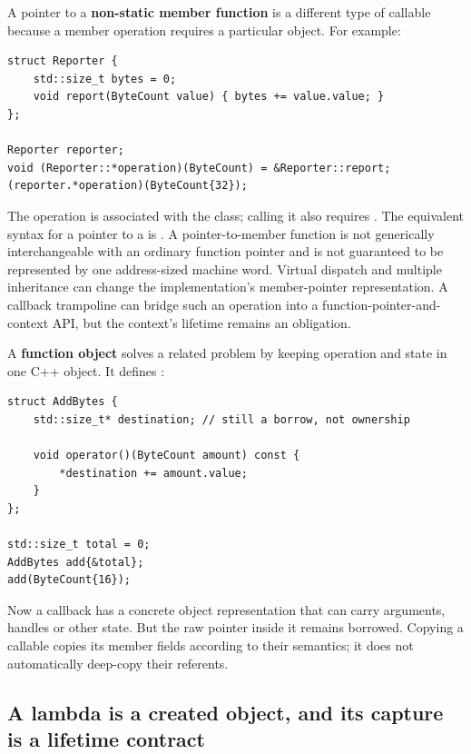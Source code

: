 A pointer to a \textbf{non-static member function} is a different type of callable because a member operation requires a particular object. For example:

\begin{verbatim}
struct Reporter {
    std::size_t bytes = 0;
    void report(ByteCount value) { bytes += value.value; }
};

Reporter reporter;
void (Reporter::*operation)(ByteCount) = &Reporter::report;
(reporter.*operation)(ByteCount{32});
\end{verbatim}

The operation is associated with the  class; calling it also requires . The equivalent syntax for a pointer to a  is . A pointer-to-member function is not generically interchangeable with an ordinary function pointer and is not guaranteed to be represented by one address-sized machine word. Virtual dispatch and multiple inheritance can change the implementation's member-pointer representation. A callback trampoline can bridge such an operation into a function-pointer-and-context API, but the context's lifetime remains an obligation.

A \textbf{function object} solves a related problem by keeping operation and state in one C++ object. It defines :

\begin{verbatim}
struct AddBytes {
    std::size_t* destination; // still a borrow, not ownership

    void operator()(ByteCount amount) const {
        *destination += amount.value;
    }
};

std::size_t total = 0;
AddBytes add{&total};
add(ByteCount{16});
\end{verbatim}

Now a callback has a concrete object representation that can carry arguments, handles or other state. But the raw pointer inside it remains borrowed. Copying a callable copies its member fields according to their semantics; it does not automatically deep-copy their referents.

\subsection{A lambda is a created object, and its capture is a lifetime contract}\label{01-foundations-i-ch004-a-lambda-is-a-created-object-and-its-capture-is-a-lifetime-contract}

